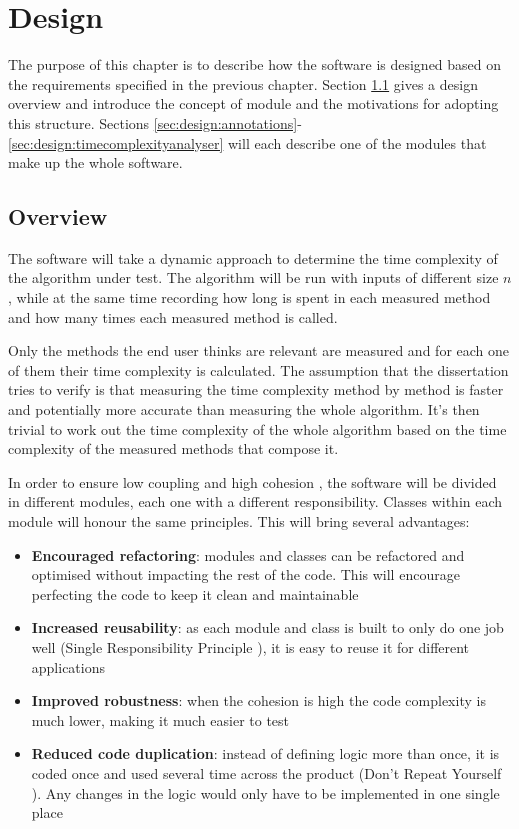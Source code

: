 \chapter{Design}

The purpose of this chapter is to describe how the software is designed based on the requirements specified in the previous chapter. Section \ref{sec:design:overview} gives a design overview and introduce the concept of module and the motivations for adopting this structure. Sections \ref{sec:design:annotations}-\ref{sec:design:timecomplexityanalyser} will each describe one of the modules that make up the whole software.


\section{Overview}
\label{sec:design:overview}
The software will take a dynamic approach to determine the time complexity of the algorithm under test. The algorithm will be run with inputs of different size $n$, while at the same time recording how long is spent in each measured method and how many times each measured method is called.

\noindent Only the methods the end user thinks are relevant are measured and for each one of them their time complexity is calculated. The assumption that the dissertation tries to verify is that measuring the time complexity method by method is faster and potentially more accurate than measuring the whole algorithm. It's then trivial to work out the time complexity of the whole algorithm based on the time complexity of the measured methods that compose it.

\noindent In order to ensure low coupling and high cohesion \cite{EYC79}, the software will be divided in different modules, each one with a different responsibility. Classes within each module will honour the same principles. This will bring several advantages:
\begin{itemize}
  \item \textbf{Encouraged refactoring}: modules and classes can be refactored and optimised without impacting the rest of the code. This will encourage perfecting the code to keep it clean and maintainable
  \item \textbf{Increased reusability}: as each module and class is built to only do one job well (Single Responsibility Principle \cite{RCM03}), it is easy to reuse it for different applications
  \item \textbf{Improved robustness}: when the cohesion is high the code complexity is much lower, making it much easier to test
  \item \textbf{Reduced code duplication}: instead of defining logic more than once, it is coded once and used several time across the product (Don't Repeat Yourself \cite{AHT99}). Any changes in the logic would only have to be implemented in one single place
\end{itemize}

